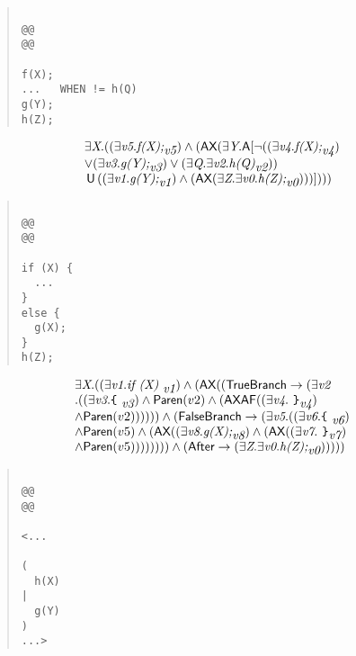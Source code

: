 \documentclass{article}
\newcommand{\U}{\,\mbox{\sf{U}}\,}
\newcommand{\A}{\mbox{\sf{A}}}
\newcommand{\AX}{\mbox{\sf{AX}}}
\newcommand{\AF}{\mbox{\sf{AF}}}
\newcommand{\mita}[1]{\mbox{\it{{#1}}}}
\newcommand{\msf}[1]{\mbox{\sf{{#1}}}}
\newcommand{\ttlb}{\mbox{\tt \char'173}}
\newcommand{\ttrb}{\mbox{\tt \char'175}}
\begin{document}
\begin{quote}\begin{verbatim}

@@
@@

f(X);
...   WHEN != h(Q)
g(Y);
h(Z);
\end{verbatim}\end{quote}

\[\begin{array}{l}
\exists \mita{X} . ((\exists \mita{v5} . \mita{f(X);}_{\mita{v5}}) \wedge (\AX(\exists \mita{Y} . \A[\neg ((\exists \mita{v4} . \mita{f(X);}_{\mita{v4}})\\ \vee (\exists \mita{v3} . \mita{g(Y);}_{\mita{v3}}) \vee (\exists \mita{Q} . \exists \mita{v2} . \mita{h(Q)}_{\mita{v2}}))\\ \U ((\exists \mita{v1} . \mita{g(Y);}_{\mita{v1}}) \wedge (\AX(\exists \mita{Z} . \exists \mita{v0} . \mita{h(Z);}_{\mita{v0}})))]
)))
\end{array}\]

\begin{quote}\begin{verbatim}

@@
@@

if (X) {
  ...
}
else {
  g(X);
}
h(Z);
\end{verbatim}\end{quote}

\[\begin{array}{l}
\exists \mita{X} . ((\exists \mita{v1} . \mita{if (X) }_{\mita{v1}}) \wedge (\AX((\msf{TrueBranch} \rightarrow (\exists \mita{v2}\\ . ((\exists \mita{v3} . \mita{{\ttlb}
  }_{\mita{v3}}) \wedge \msf{Paren}(v2) \wedge (\AX\AF((\exists \mita{v4} . \mita{
{\ttrb}}_{\mita{v4}})\\ \wedge \msf{Paren}(v2)))))) \wedge (\msf{FalseBranch} \rightarrow (\exists \mita{v5} . ((\exists \mita{v6} . \mita{{\ttlb}
  }_{\mita{v6}})\\ \wedge \msf{Paren}(v5) \wedge (\AX((\exists \mita{v8} . \mita{g(X);}_{\mita{v8}}) \wedge (\AX((\exists \mita{v7} . \mita{
{\ttrb}}_{\mita{v7}})\\ \wedge \msf{Paren}(v5)))))))) \wedge (\msf{After} \rightarrow (\exists \mita{Z} . \exists \mita{v0} . \mita{h(Z);}_{\mita{v0}})))))
\end{array}\]

\begin{quote}\begin{verbatim}

@@
@@

<...
  
(
  h(X)
|
  g(Y)
)
...>
\end{verbatim}\end{quote}
\end{document}
